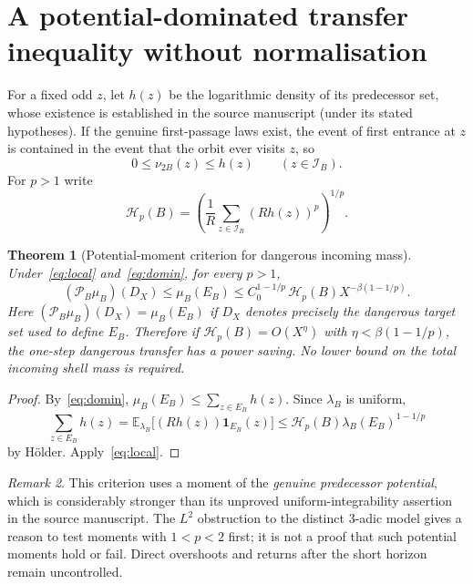 \documentclass[10pt]{amsart}
\newtheorem{theorem}{Theorem}
\theoremstyle{definition}\newtheorem{definition}[theorem]{Definition}
\theoremstyle{remark}\newtheorem{remark}[theorem]{Remark}
\newcommand{\E}{\mathbb E}
\newcommand{\one}{\mathbf1}
\newcommand{\cP}{\mathcal P}
\newcommand{\cI}{\mathcal I}
\begin{document}
\section{A potential-dominated transfer inequality without normalisation}
For a fixed odd $z$, let $h(z)$ be the logarithmic density of its predecessor set, whose existence is established in the source manuscript (under its stated hypotheses). If the genuine first-passage laws exist, the event of first entrance at $z$ is contained in the event that the orbit ever visits $z$, so
\begin{equation}\label{eq:domin}
 0\le\nu_{2B}(z)\le h(z)\qquad(z\in\cI_B).
\end{equation}
For $p>1$ write
\[
 \mathcal H_p(B)=\left(\frac1R\sum_{z\in\cI_B}(R h(z))^p\right)^{1/p}.
\]
\begin{theorem}[Potential-moment criterion for dangerous incoming mass]\label{thm:potential}
Under~\eqref{eq:local} and~\eqref{eq:domin}, for every $p>1$,
\begin{equation}\label{eq:potential}
 \boxed{\quad(\cP_B\mu_B)(D_X)\le\mu_B(E_B)\le C_0^{1-1/p}\,\mathcal H_p(B) X^{-\beta(1-1/p)}.\quad}
\end{equation}
Here $(\cP_B\mu_B)(D_X)=\mu_B(E_B)$ if $D_X$ denotes precisely the dangerous target set used to define $E_B$. Therefore if $\mathcal H_p(B)=O(X^\eta)$ with $\eta<\beta(1-1/p)$, the one-step dangerous transfer has a power saving. No lower bound on the total incoming shell mass is required.
\end{theorem}
\begin{proof}
By~\eqref{eq:domin}, $\mu_B(E_B)\le\sum_{z\in E_B}h(z)$. Since $\lambda_B$ is uniform,
\[
 \sum_{z\in E_B}h(z)=\E_{\lambda_B}\bigl[(R h(z))\one_{E_B}(z)\bigr]
 \le\mathcal H_p(B)\lambda_B(E_B)^{1-1/p}
\]
by H\"older. Apply~\eqref{eq:local}.
\end{proof}
\begin{remark}
This criterion uses a moment of the \emph{genuine predecessor potential}, which is considerably stronger than its unproved uniform-integrability assertion in the source manuscript. The $L^2$ obstruction to the distinct $3$-adic model gives a reason to test moments with $1<p<2$ first; it is not a proof that such potential moments hold or fail. Direct overshoots and returns after the short horizon remain uncontrolled.
\end{remark}
\end{document}
